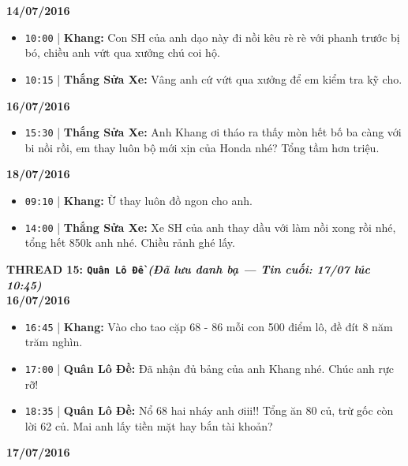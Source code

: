 \documentclass[12pt,a4paper]{article}
\begin{document}
\textbf{14/07/2016}

\begin{itemize}[leftmargin=*, itemsep=2pt, topsep=2pt, parsep=0pt]
  \item \texttt{10:00} | \textbf{Khang:} Con SH của anh dạo này đi nồi kêu rè rè với phanh trước bị bó, chiều anh vứt qua xưởng chú coi hộ.
  \item \texttt{10:15} | \textbf{Thắng Sửa Xe:} Vâng anh cứ vứt qua xưởng để em kiểm tra kỹ cho.

\end{itemize}
\textbf{16/07/2016}

\begin{itemize}[leftmargin=*, itemsep=2pt, topsep=2pt, parsep=0pt]
  \item \texttt{15:30} | \textbf{Thắng Sửa Xe:} Anh Khang ơi tháo ra thấy mòn hết bố ba càng với bi nồi rồi, em thay luôn bộ mới xịn của Honda nhé? Tổng tầm hơn triệu.

\end{itemize}
\textbf{18/07/2016}

\begin{itemize}[leftmargin=*, itemsep=2pt, topsep=2pt, parsep=0pt]
  \item \texttt{09:10} | \textbf{Khang:} Ừ thay luôn đồ ngon cho anh.
  \item \texttt{14:00} | \textbf{Thắng Sửa Xe:} Xe SH của anh thay dầu với làm nồi xong rồi nhé, tổng hết 850k anh nhé. Chiều rảnh ghé lấy.


\end{itemize}

\vspace{0.3cm}\noindent\textbf{\large  THREAD 15: \texttt{Quân Lô Đề} \textit{(Đã lưu danh bạ — Tin cuối: 17/07 lúc 10:45)}}\\[0.15cm]


\textbf{16/07/2016}

\begin{itemize}[leftmargin=*, itemsep=2pt, topsep=2pt, parsep=0pt]
  \item \texttt{16:45} | \textbf{Khang:} Vào cho tao cặp 68 - 86 mỗi con 500 điểm lô, đề đít 8 năm trăm nghìn.
  \item \texttt{17:00} | \textbf{Quân Lô Đề:} Đã nhận đủ bảng của anh Khang nhé. Chúc anh rực rỡ!
  \item \texttt{18:35} | \textbf{Quân Lô Đề:} Nổ 68 hai nháy anh ơiii!! Tổng ăn 80 củ, trừ gốc còn lời 62 củ. Mai anh lấy tiền mặt hay bắn tài khoản?

\end{itemize}
\textbf{17/07/2016}
\end{document}
